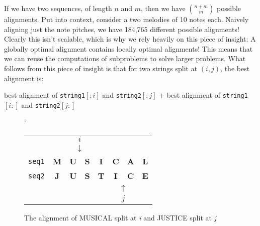 If we have two sequences, of length $n$ and $m$, then we have $\binom{n+m}{m}$ possible alignments. Put into context, consider a two melodies of 10 notes each. Naively aligning just the note pitches, we have 184,765 different possible alignments! Clearly this isn't scalable, which is why we rely heavily on this piece of insight: A globally optimal alignment contains locally optimal alignments! This means that we can reuse the computations of subproblems to solve larger problems. What follows from this piece of insight is that for two strings split at $(i, j)$, the best alignment is:

\begin{center}
best alignment of \texttt{string1}$[:i]$ and \texttt{string2}$[:j]$ 
$+$ best alignment of \texttt{string1}$[i:]$ and \texttt{string2}$[j:]$
\end{center}

\begin{figure}[!h]`
\centering
\begin{tabular}{lccccccc}
   & {\color[HTML]{333333} \textbf{}} & \multicolumn{2}{c}{{\color[HTML]{333333} $i$}}          & {\color[HTML]{333333} \textbf{}} & {\color[HTML]{333333} \textbf{}} & {\color[HTML]{333333} \textbf{}} & {\color[HTML]{333333} \textbf{}} \\
   & {\color[HTML]{333333} \textbf{}} & \multicolumn{2}{c}{{\color[HTML]{333333} $\downarrow$}} & {\color[HTML]{333333} \textbf{}} & {\color[HTML]{333333} \textbf{}} & {\color[HTML]{333333} \textbf{}} & {\color[HTML]{333333} \textbf{}} \\
\texttt{seq1} & \textbf{M}                       & \textbf{U}                  & \textbf{S}                & \textbf{I}                       & \textbf{C}                       & \textbf{A}                       & \textbf{L}                       \\
\texttt{seq2} & \textbf{J}                       & \textbf{U}                  & \textbf{S}                & \textbf{T}                       & \textbf{I}                       & \textbf{C}                       & \textbf{E}                       \\
   &                                  &                             &                           &                                  & \multicolumn{2}{c}{$\uparrow$}                                      &                                  \\
   &                                  &                             &                           &                                  & \multicolumn{2}{c}{$j$}                                             &                                 
\end{tabular}
\caption{The alignment of MUSICAL split at \textit{i} and JUSTICE split at \textit{j}}
\label{indexed musical and justice}
\end{figure}

